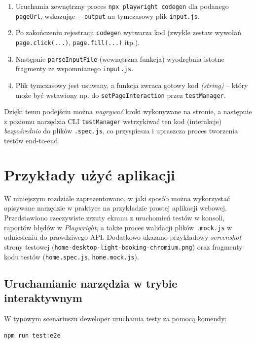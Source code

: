 \documentclass[12pt]{report}
\begin{document}
\begin{enumerate}
  \item Uruchamia zewnętrzny proces \texttt{npx playwright codegen} dla podanego \verb|pageUrl|, wskazując \verb|--output| na tymczasowy plik \verb|input.js|.
  \item Po zakończeniu rejestracji \texttt{codegen} wytwarza kod (zwykle zestaw wywołań \verb|page.click(...)|, \verb|page.fill(...)| itp.).
  \item Następnie \verb|parseInputFile| (wewnętrzna funkcja) wyodrębnia istotne fragmenty ze wspomnianego \verb|input.js|.
  \item Plik tymczasowy jest usuwany, a funkcja zwraca gotowy kod \emph{(string)} – który może być wstawiony np. do \verb|setPageInteraction| przez \texttt{testManager}.
\end{enumerate}

Dzięki temu podejściu można \emph{nagrywać} kroki wykonywane na stronie, a następnie z poziomu narzędzia CLI \texttt{testManager} wstrzykiwać ten kod (interakcje) \emph{bezpośrednio} do plików \verb|.spec.js|, co przyspiesza i upraszcza proces tworzenia testów end-to-end.

\chapter{Przykłady użyć aplikacji}
\label{chap:przyklady-uzyc}

W niniejszym rozdziale zaprezentowano, w jaki sposób można wykorzystać opisywane narzędzie w praktyce na przykładzie prostej aplikacji webowej. Przedstawiono rzeczywiste zrzuty ekranu z uruchomień testów w konsoli, raportów błędów w \emph{Playwright}, a także proces walidacji plików \texttt{.mock.js} w odniesieniu do prawdziwego API. Dodatkowo ukazano przykładowy \emph{screenshot} strony testowej (\texttt{home-desktop-light-booking-chromium.png}) oraz fragmenty kodu testów (\texttt{home.spec.js}, \texttt{home.mock.js}).

\section{Uruchamianie narzędzia w trybie interaktywnym}
\label{sec:uruchamianie-narzedzia}

W typowym scenariuszu deweloper uruchamia testy za pomocą komendy:

\begin{center}
\texttt{npm run test:e2e}
\end{center}
\end{document}
